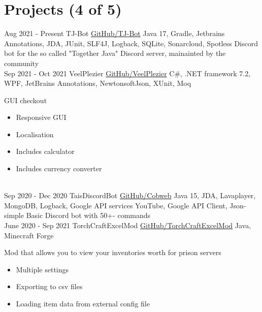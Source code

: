 \documentclass[letterpaper]{twentysecondcv} %
\begin{document}
    \newpage

    \makesidebarSecond %



    \section{Projects (4 of 5)}
    \begin{twenty} %
        \twentyitem
        {Aug 2021 -}
        {Present}
        {TJ-Bot}
        {\href{https://github.com/Together-Java/TJ-Bot/}{GitHub/TJ-Bot}}
        {Java 17, Gradle, Jetbrains Annotations, JDA, JUnit, SLF4J, Logback, SQLite, Sonarcloud, Spotless}
        {Discord bot for the so called "Together Java" Discord server, mainainted by the community}\\
        \twentyitem
        {Sep 2021 -}
        {Oct 2021}
        {VeelPlezier}
        {\href{https://github.com/Tais993/VeelPlezier}{GitHub/VeelPlezier}}
        {C\#, .NET framework 7.2, WPF, JetBrains Annotations, NewtonsoftJson, XUnit, Moq}
        {
            GUI checkout
            \begin{itemize}
                \item Responsive GUI
                \item Localisation
                \item Includes calculator
                \item Includes currency converter
            \end{itemize}}\\
        \twentyitem
        {Sep 2020 -}
        {Dec 2020}
        {TaisDiscordBot}
        {\href{https://github.com/Tais993/taisdiscordbot}{GitHub/Cobweb}}
        {Java 15, JDA, Lavaplayer, MongoDB, Logback, Google API services YouTube, Google API Client, Json-simple}
        {Basic Discord bot with 50+- commands}\\
        \twentyitem
        {June 2020 -}
        {Sep 2021}
        {TorchCraftExcelMod}
        {\href{https://github.com/Tais993/TorchCraftExcelMod}{GitHub/TorchCraftExcelMod}}
        {Java, Minecraft Forge}
        {
            Mod that allows you to view your inventories worth for prison servers
            \begin{itemize}
                \item Multiple settings
                \item Exporting to csv files
                \item Loading item data from external config file
            \end{itemize}}\\
    \end{twenty}
\end{document}
